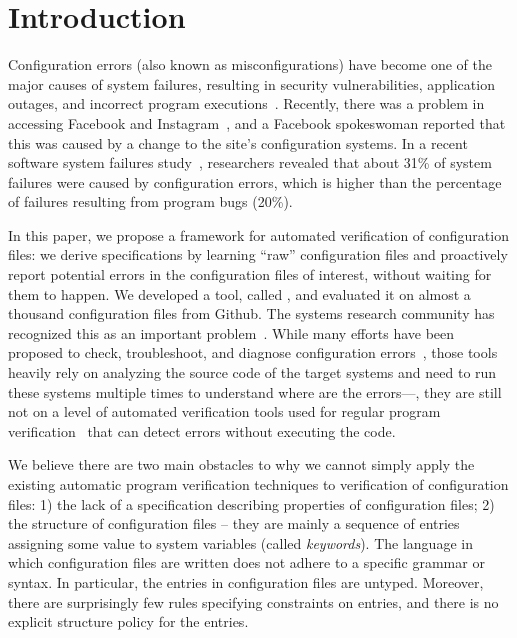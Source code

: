 \section{Introduction}
\label{sec-intro}

Configuration errors (also known as misconfigurations) have become
one of the major causes of system failures, resulting in security vulnerabilities,
application outages, and incorrect program executions~\cite{xu15systems, xu13do, xu15hey}. Recently, there was a problem in accessing  
Facebook and Instagram~\cite{mashableNews}, 
and a Facebook spokeswoman reported that 
this was caused by a change to the site's configuration systems.
In a recent software system failures study~\cite{yin11anempirical},
researchers revealed that about 31\% of system failures were caused by 
configuration errors, which is higher than the percentage of
failures resulting from program bugs (20\%).

In this paper, we propose
a framework for automated verification of configuration files: 
we derive specifications by learning ``raw'' configuration files 
and proactively report potential errors in the configuration files
of interest, without waiting for them to happen. 
We developed a tool, called \app, 
and evaluated it on 
almost a thousand configuration files from Github. The systems research community has recognized this as an important
problem~\cite{xu16early}. While many efforts have been proposed to
check, troubleshoot, and diagnose configuration 
errors~\cite{attariyan10automating,
su07autobash, whitaker04configuration},
those tools heavily rely on analyzing the source code of 
the target systems and need to run these systems
multiple times to understand where are the errors---\ie,
they are still not on a level of
automated verification tools used for regular program 
verification~\cite{Leino10Dafny, PiskacWZ14, BobotFMP15} that can
detect errors without executing the code. 

We believe there are two main obstacles 
to why we cannot simply apply the existing automatic program
verification 
techniques to verification of configuration files:
1) the lack
of a specification describing properties of configuration files;
2) the structure of configuration files -- they
are mainly a sequence of entries assigning some value to system
variables (called {\emph {keywords}}). 
The language in which configuration files are written does 
not adhere to a specific grammar or syntax. In particular, the
entries in configuration files are untyped. Moreover, there are surprisingly few rules specifying constraints on entries, and there
is no explicit structure policy for the entries.

